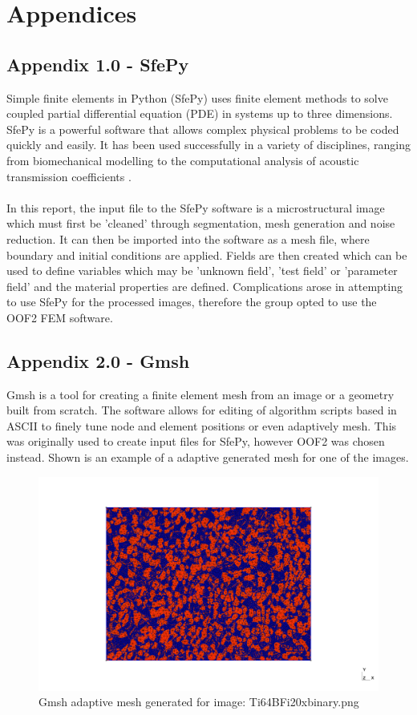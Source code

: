 \documentclass[\report.tex]{subfiles}
\begin{document}
\section{Appendices}

\subsection{Appendix 1.0 - SfePy}
Simple finite elements in Python (SfePy) uses finite element methods to solve coupled partial differential equation (PDE) in systems up to three dimensions. SfePy is a powerful software that allows complex physical problems to be coded quickly and easily. It has been used successfully in a variety of disciplines, ranging from biomechanical modelling \cite{biomedapplication} to the computational analysis of acoustic transmission coefficients \cite{AcousticTransmission}.\\ \\In this report, the input file to the SfePy software is a microstructural image which must first be 'cleaned' through segmentation, mesh generation and noise reduction. It can then be imported into the software as a mesh file, where boundary and initial conditions are applied. Fields are then created which can be used to define variables which may be 'unknown field', 'test field' or 'parameter field' \cite{FEMinSfePy} and the material properties are defined. Complications arose in attempting to use SfePy for the processed images, therefore the group opted to use the OOF2 FEM software.


\subsection{Appendix 2.0 - Gmsh}
Gmsh is a tool for creating a finite element mesh from an image or a geometry built from scratch. The software allows for editing of algorithm scripts based in ASCII to finely tune node and element positions or even adaptively mesh. This was originally used to create input files for SfePy, however OOF2 was chosen instead. Shown is an example of a adaptive generated mesh for one of the images.

\begin{figure}[h!]
    \centering
    \includegraphics[width=14cm]{Images/out.png}
    \caption{Gmsh adaptive mesh generated for image: Ti64BFi20xbinary.png}
    \label{fig:gmsh}
\end{figure}
\end{document}
